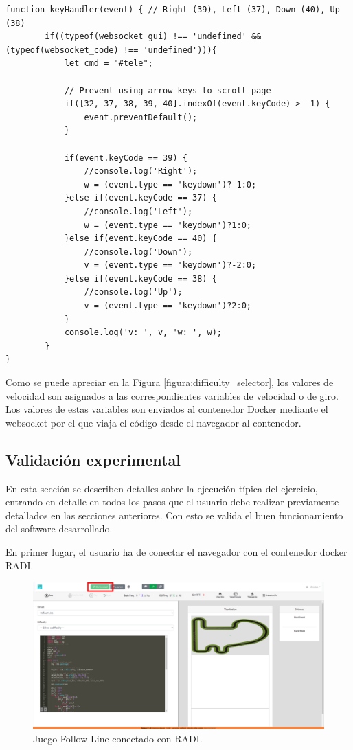 \documentclass[a4paper, 12pt]{book}
\begin{document}
\begin{lstlisting}[basicstyle=\ttfamily\scriptsize]
function keyHandler(event) { // Right (39), Left (37), Down (40), Up (38)
		if((typeof(websocket_gui) !== 'undefined' && (typeof(websocket_code) !== 'undefined'))){
			let cmd = "#tele";

			// Prevent using arrow keys to scroll page
			if([32, 37, 38, 39, 40].indexOf(event.keyCode) > -1) {
				event.preventDefault();
			}

			if(event.keyCode == 39) {
				//console.log('Right');
				w = (event.type == 'keydown')?-1:0;
			}else if(event.keyCode == 37) {
				//console.log('Left');
				w = (event.type == 'keydown')?1:0;
			}else if(event.keyCode == 40) {
				//console.log('Down');
				v = (event.type == 'keydown')?-2:0;
			}else if(event.keyCode == 38) {
				//console.log('Up');
				v = (event.type == 'keydown')?2:0;
			}
			console.log('v: ', v, 'w: ', w);
		}
}
\end{lstlisting}


Como se puede apreciar en la Figura \ref{figura:difficulty_selector}, los valores de velocidad son asignados a las correspondientes variables de velocidad o de giro. Los valores de estas variables son enviados al contenedor Docker mediante el websocket por el que viaja el código desde el navegador al contenedor.

\subsection{Validación experimental}

En esta sección se describen detalles sobre la ejecución típica del ejercicio, entrando en detalle en todos los pasos que el usuario debe realizar previamente detallados en las secciones anteriores. Con esto se valida el buen funcionamiento del software desarrollado.

En primer lugar, el usuario ha de conectar el navegador con el contenedor docker RADI.

\begin{figure}[H]
	\centering
    \includegraphics[width=\textwidth]{img/fl_radi_connected_rect.png}
    \caption{Juego Follow Line conectado con RADI.}
    \label{figura:evaluator_drone}
\end{figure}
\end{document}
